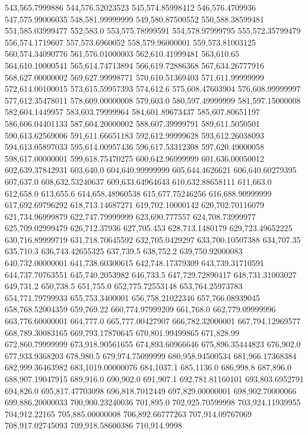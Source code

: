 543,565.7999886
544,576.52023523
545,574.85998412
546,576.4709936
547,575.99006035
548,581.99999999
549,580.87500552
550,588.38599481
551,585.03999477
552,583.0
553,575.78999591
554,578.97999795
555,572.35799479
556,574.1719607
557,573.6960052
558,579.96000001
559,573.81003125
560,574.34090776
561,576.01000003
562,610.41999481
563,610.65
564,610.10000541
565,614.74713894
566,619.72886368
567,634.26777916
568,627.00000002
569,627.99998771
570,610.51369403
571,611.99999999
572,614.00100015
573,615.59957393
574,612.6
575,608.47603904
576,608.99999997
577,612.35478011
578,609.00000008
579,603.0
580,597.49999999
581,597.15000008
582,604.1449957
583,603.79999964
584,601.89673437
585,607.80651197
586,606.04401133
587,604.20000002
588,607.39999791
589,611.5050501
590,613.62569006
591,611.66651183
592,612.99999628
593,612.26038093
594,613.05897033
595,614.00957436
596,617.53312308
597,620.49000058
598,617.00000001
599,618.75470275
600,642.96999999
601,636.00050012
602,639.37842931
603,640.0
604,640.99999999
605,644.4626621
606,640.60279395
607,637.0
608,632.53240637
609,633.64964643
610,632.88658111
611,663.0
612,658.0
613,655.6
614,658.48960538
615,677.75246256
616,688.90999999
617,692.69796292
618,713.14687271
619,702.10000142
620,702.70116079
621,734.96999879
622,747.79999999
623,690.777557
624,708.73999977
625,709.02999479
626,712.37936
627,705.453
628,713.1480179
629,723.49652225
630,716.89999719
631,718.70645592
632,705.0429297
633,700.10507388
634,707.35
635,710.3
636,743.42655325
637,739.5
638,752.2
639,750.92000083
640,732.00000001
641,738.60300615
642,748.17379309
643,739.31710591
644,737.70763551
645,740.2053982
646,733.5
647,729.72890417
648,731.31003027
649,731.2
650,738.5
651,755.0
652,775.72553148
653,764.25973783
654,771.79799933
655,753.3400001
656,758.21022346
657,766.08939045
658,768.52004359
659,769.22
660,774.97999209
661,768.0
662,779.09999996
663,776.60000001
664,777.0
665,777.00427907
666,782.32000001
667,794.12969577
668,789.30083165
669,793.17870645
670,801.99499865
671,828.99
672,860.79999999
673,918.90561655
674,893.60966646
675,896.35444823
676,902.0
677,933.9368203
678,980.5
679,974.75099999
680,958.94500534
681,966.17368384
682,999.36463982
683,1019.00000076
684,1037.1
685,1136.0
686,998.8
687,896.0
688,907.19047915
689,916.0
690,902.0
691,907.1
692,781.81160101
693,803.6952791
694,826.0
695,817.47703098
696,818.7012449
697,829.00000001
698,902.70000066
699,886.20000033
700,900.23240036
701,895.0
702,925.70599998
703,924.11939955
704,912.22165
705,885.00000008
706,892.66777263
707,914.09767069
708,917.02745093
709,918.58600386
710,914.9998
